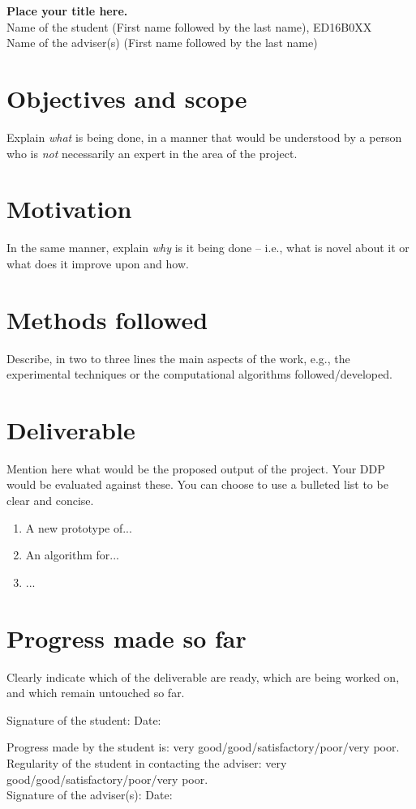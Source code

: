 \documentclass[a4paper,12pt]{article}
\date{}
\begin{document}
%
\begin{center}
		\textbf{\Large		Place your title here.}
		\vspace{5mm}\\
		Name of the student (First name followed by the last name), ED16B0XX\\
		Name of the adviser(s) (First name followed by the last name)
\end{center}
%
\section*{Objectives and scope}
%
Explain {\em what} is being done, in a manner that would be understood by a
person who is {\em not} necessarily an expert in the area of the project. 
%
\section*{Motivation}
%
In the same manner, explain {\em why} is it being done -- i.e., what is 
novel about it or what does it improve upon and how. 
%
\section*{Methods followed}
%
Describe, in two to three lines the main aspects of the work, e.g., the  
experimental techniques or the computational algorithms followed/developed.
%
\section*{Deliverable}
%
Mention here what would be the proposed output of the project. Your DDP would 
be evaluated against these. You can choose to use a bulleted list to be clear
and concise. 
%
\begin{enumerate}
		\item A new prototype of...
		\item An algorithm for...
		\item ...
\end{enumerate}
%
\section*{Progress made so far}
%
Clearly indicate which of the deliverable are ready, which are being 
worked on, and which remain untouched so far. 
\vspace{5mm}
\hline
%
\vspace{3mm}

Signature of the student: \hfill Date: \hspace{1.5in}

\vspace{3mm}
Progress made by the student is: very good/good/satisfactory/poor/very poor.\\
Regularity of the student in contacting the adviser: very 
good/good/satisfactory/poor/very poor.
\vspace{3mm}\\
Signature of the adviser(s): \hfill Date: \hspace{1.5in}
%
\end{document}
